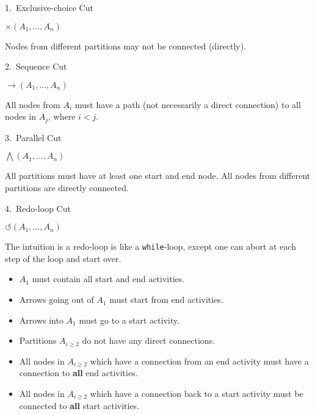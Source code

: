 \documentclass[english]{panikzettel}
\begin{document}
\begin{halfboxl}
    \vspace{0\baselineskip}
    \begin{defi}{1.\ Exclusive-choice Cut}
        \begin{tightcenter}\large{}$\times(A_1, \ldots, A_n)$\end{tightcenter}

        Nodes from different partitions may not be connected (directly).
    \end{defi}

    \begin{defi}{2.\ Sequence Cut}
        \begin{tightcenter}\large{}$\rightarrow(A_1, \ldots, A_n)$\end{tightcenter}

        All nodes from $A_i$ must have a path (not necessarily a direct connection) to all nodes in $A_j$, where $i < j$.
    \end{defi}

    \begin{defi}{3.\ Parallel Cut}
        \begin{tightcenter}\large{}$\bigwedge(A_1, \ldots, A_n)$\end{tightcenter}

        All partitions must have at least one start and end node.
        All nodes from different partitions are directly connected.
    \end{defi}
\end{halfboxl}%
\begin{halfboxr}
    \vspace{0\baselineskip}
    \begin{defi}{4.\ Redo-loop Cut}
        \begin{tightcenter}\large{}$\circlearrowleft(A_1, \ldots, A_n)$\end{tightcenter}

        The intuition is a redo-loop is like a \texttt{while}-loop, except one can abort at each step of the loop and start over.
        \begin{itemize}[leftmargin=*]
            \item $A_1$ must contain all start and end activities.
            \item Arrows going out of $A_1$ must start from end activities.
            \item Arrows into $A_1$ must go to a start activity.
            \item Partitions $A_{i \geq 2}$ do not have any direct connections.
            \item All nodes in $A_{i \geq 2}$ which have a connection from an end activity must have a connection to \textbf{all} end activities.
            \item All nodes in $A_{i \geq 2}$ which have a connection back to a start activity must be connected to \textbf{all} start activities.
        \end{itemize}
    \end{defi}
\end{halfboxr}
\end{document}

